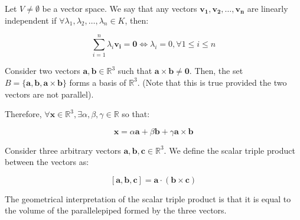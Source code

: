 \documentclass[12pt]{article}
\begin{document}
\begin{definition}
    Let $V \neq \emptyset$ be a vector space. We say that any vectors $\mathbf{v_1, v_2, \dots, v_n}$ are linearly independent if $\forall \lambda_1, \lambda_2, \dots, \lambda_n \in K$, then:

    \[ \sum_{i = 1}^n \lambda_i\mathbf{v_i} = \mathbf{0} \iff \lambda_i = 0, \forall 1 \leq i \leq n \]
\end{definition}

\begin{theorem}
    Consider two vectors $\mathbf{a, b} \in \mathbb{R}^3$ such that $\mathbf{a \times b} \neq \mathbf{0}$. Then, the set $B = \{\mathbf{a, b, a \times b}\}$ forms a basis of $\mathbb{R}^3$. (Note that this is true provided the two vectors are not parallel).
\end{theorem}

Therefore, $\forall \mathbf{x} \in \mathbb{R}^3, \exists \alpha, \beta, \gamma \in \mathbb{R}$ so that:

\[ \mathbf{x} = \alpha\mathbf{a} + \beta\mathbf{b} + \gamma\mathbf{a \times b} \]

\begin{definition}
    Consider three arbitrary vectors $\mathbf{a, b, c} \in \mathbb{R}^3$. We define the scalar triple product between the vectors as:

    \[ [\mathbf{a, b, c}] = \mathbf{a \cdot (\mathbf{b \times c})}\] 
\end{definition}

The geometrical interpretation of the scalar triple product is that it is equal to the volume of the parallelepiped formed by the three vectors.
\end{document}

